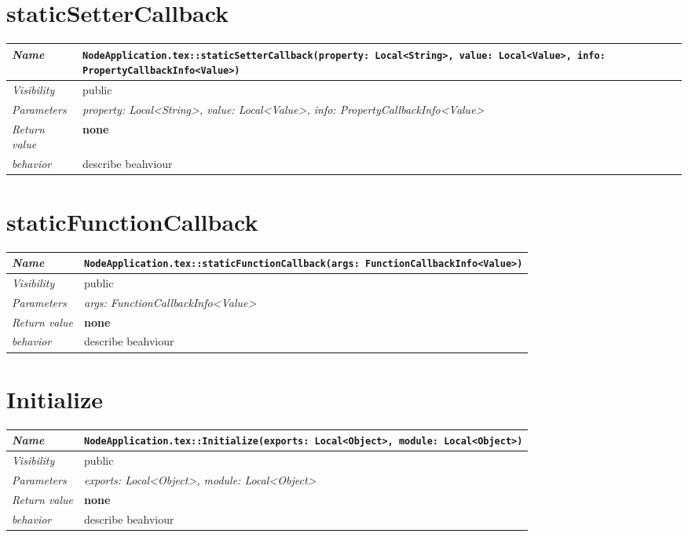  \section{staticSetterCallback}
\begin{longtable}{p{3cm} @{\hskip 1cm} p{12cm}}
 \hline
\textit{Name} & \texttt{NodeApplication.tex::staticSetterCallback(property: Local<String>, value: Local<Value>, info: PropertyCallbackInfo<Value>)}\\
\hline
 \textit{Visibility} & public\\
\hline
\textit{Parameters} & \textit{property: Local<String>, value: Local<Value>, info: PropertyCallbackInfo<Value>}\\
\hline
\textit{Return value} & \textbf{none}\\
  \hline
 \textit{behavior} & describe beahviour \\
\hline
\end{longtable} \pagebreak
 \section{staticFunctionCallback}
\begin{longtable}{p{3cm} @{\hskip 1cm} p{12cm}}
 \hline
\textit{Name} & \texttt{NodeApplication.tex::staticFunctionCallback(args: FunctionCallbackInfo<Value>)}\\
\hline
 \textit{Visibility} & public\\
\hline
\textit{Parameters} & \textit{args: FunctionCallbackInfo<Value>}\\
\hline
\textit{Return value} & \textbf{none}\\
  \hline
 \textit{behavior} & describe beahviour \\
\hline
\end{longtable} \pagebreak
 \section{Initialize}
\begin{longtable}{p{3cm} @{\hskip 1cm} p{12cm}}
 \hline
\textit{Name} & \texttt{NodeApplication.tex::Initialize(exports: Local<Object>, module: Local<Object>)}\\
\hline
 \textit{Visibility} & public\\
\hline
\textit{Parameters} & \textit{exports: Local<Object>, module: Local<Object>}\\
\hline
\textit{Return value} & \textbf{none}\\
  \hline
 \textit{behavior} & describe beahviour \\
\hline
\end{longtable} \pagebreak
